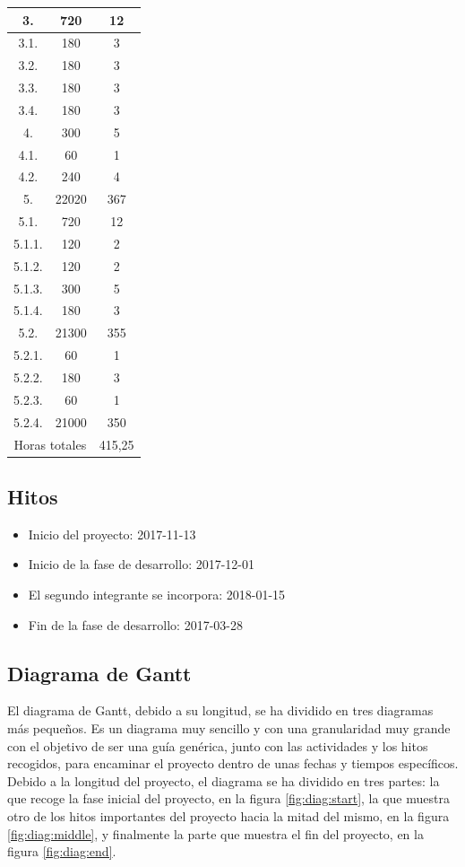 \begin{longtable}{c|c|c}
3. & 720 & 12 \\ \hline
3.1. & 180 & 3 \\ \hline
3.2. & 180 & 3 \\ \hline
3.3. & 180 & 3 \\ \hline
3.4. & 180 & 3 \\ \hline
4. & 300 & 5 \\ \hline
4.1. & 60 & 1 \\ \hline
4.2. & 240 & 4 \\ \hline
5. & 22020 & 367 \\ \hline
5.1. & 720 & 12 \\ \hline
5.1.1. & 120 & 2 \\ \hline
5.1.2. & 120 & 2 \\ \hline
5.1.3. & 300 & 5 \\ \hline
5.1.4. & 180 & 3 \\ \hline
5.2. & 21300 & 355 \\ \hline
5.2.1. & 60 & 1 \\ \hline
5.2.2. & 180 & 3 \\ \hline
5.2.3. & 60 & 1 \\ \hline
5.2.4. & 21000 & 350 \\ \hline
\multicolumn{2}{c|}{Horas totales} & 415,25 \\
\end{longtable}

\subsection{Hitos}
\begin{itemize}
  \item Inicio del proyecto: 2017-11-13
  \item Inicio de la fase de desarrollo: 2017-12-01
  \item El segundo integrante se incorpora: 2018-01-15
  \item Fin de la fase de desarrollo: 2017-03-28
\end{itemize}

\subsection{Diagrama de Gantt}
El diagrama de Gantt, debido a su longitud, se ha dividido en tres diagramas
más pequeños. Es un diagrama muy sencillo y con una granularidad muy grande
con el objetivo de ser una guía genérica, junto con las actividades y los hitos
recogidos, para encaminar el proyecto dentro de unas fechas y tiempos
específicos. Debido a la longitud del proyecto, el diagrama se ha dividido
en tres partes: la que recoge la fase inicial del proyecto, en la figura
\ref{fig:diag:start}, la que muestra otro de los hitos importantes del proyecto
hacia la mitad del mismo, en la figura \ref{fig:diag:middle}, y finalmente la
parte que muestra el fin del proyecto, en la figura \ref{fig:diag:end}.

